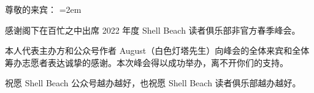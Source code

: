 \documentclass[a4paper,10pt]{article}
\begin{document}
\rmfamily


尊敬的来宾：
\vspace{1em}
\parindent=2em

感谢阁下在百忙之中出席 2022 年度 Shell Beach 读者俱乐部非官方春季峰会。

本人代表主办方和公众号作者 August（白色灯塔先生）向峰会的全体来宾和全体筹办志愿者表达诚挚的感谢。本次峰会得以成功举办，离不开你们的支持。

祝愿 Shell Beach 公众号越办越好，也祝愿 Shell Beach 读者俱乐部越办越好。

\end{document}
